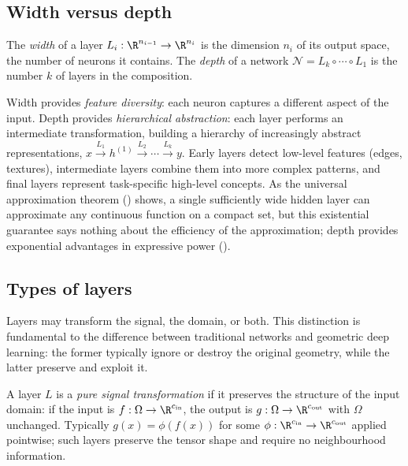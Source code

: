 \subsection{Width versus depth}
\label{sec:found:width-depth}

\begin{definition}
\label{def:found:width-depth}
The \emph{width} of a layer $L_i : \R^{n_{i-1}} \to \R^{n_i}$ is the dimension
$n_i$ of its output space, the number of neurons it contains. The \emph{depth} of
a network $\mathcal{N} = L_k \circ \cdots \circ L_1$ is the number $k$ of layers
in the composition.
\end{definition}

Width provides \emph{feature diversity}: each neuron captures a different aspect
of the input. Depth provides \emph{hierarchical abstraction}: each layer performs
an intermediate transformation, building a hierarchy of increasingly abstract
representations,
$x \xrightarrow{L_1} h^{(1)} \xrightarrow{L_2} \cdots \xrightarrow{L_k} y$. Early
layers detect low-level features (edges, textures), intermediate layers combine
them into more complex patterns, and final layers represent task-specific
high-level concepts. As the universal approximation theorem
() shows, a single sufficiently wide hidden layer can
approximate any continuous function on a compact set, but this existential
guarantee says nothing about the efficiency of the approximation; depth provides
exponential advantages in expressive power ().

\subsection{Types of layers}
\label{sec:found:layer-types}

Layers may transform the signal, the domain, or both. This distinction is
fundamental to the difference between traditional networks and geometric deep
learning: the former typically ignore or destroy the original geometry, while the
latter preserve and exploit it.

\begin{definition}
\label{def:found:signal-transform}
A layer $L$ is a \emph{pure signal transformation} if it preserves the structure
of the input domain: if the input is $f : \Omega \to \R^{c_{\mathrm{in}}}$, the
output is $g : \Omega \to \R^{c_{\mathrm{out}}}$ with $\Omega$ unchanged.
Typically $g(x) = \phi(f(x))$ for some
$\phi : \R^{c_{\mathrm{in}}} \to \R^{c_{\mathrm{out}}}$ applied pointwise; such
layers preserve the tensor shape and require no neighbourhood information.
\end{definition}

